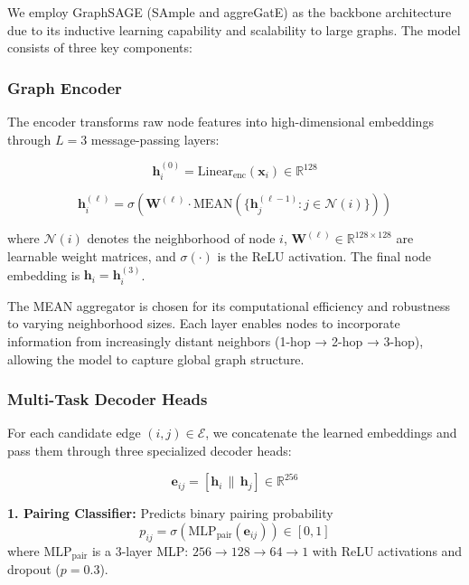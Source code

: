 We employ GraphSAGE (SAmple and aggreGatE) as the backbone architecture due to its inductive learning capability and scalability to large graphs. The model consists of three key components:

\subsubsection{Graph Encoder}

The encoder transforms raw node features into high-dimensional embeddings through $L=3$ message-passing layers:

\begin{equation}
\mathbf{h}_i^{(0)} = \text{Linear}_{\text{enc}}(\mathbf{x}_i) \in \mathbb{R}^{128}
\end{equation}

\begin{equation}
\mathbf{h}_i^{(\ell)} = \sigma\left( \mathbf{W}^{(\ell)} \cdot \text{MEAN}\left(\{\mathbf{h}_j^{(\ell-1)} : j \in \mathcal{N}(i)\}\right) \right)
\end{equation}

where $\mathcal{N}(i)$ denotes the neighborhood of node $i$, $\mathbf{W}^{(\ell)} \in \mathbb{R}^{128 \times 128}$ are learnable weight matrices, and $\sigma(\cdot)$ is the ReLU activation. The final node embedding is $\mathbf{h}_i = \mathbf{h}_i^{(3)}$.

The MEAN aggregator is chosen for its computational efficiency and robustness to varying neighborhood sizes. Each layer enables nodes to incorporate information from increasingly distant neighbors (1-hop → 2-hop → 3-hop), allowing the model to capture global graph structure.

\subsubsection{Multi-Task Decoder Heads}

For each candidate edge $(i, j) \in \mathcal{E}$, we concatenate the learned embeddings and pass them through three specialized decoder heads:

\begin{equation}
\mathbf{e}_{ij} = [\mathbf{h}_i \, \| \, \mathbf{h}_j] \in \mathbb{R}^{256}
\end{equation}

\textbf{1. Pairing Classifier:} Predicts binary pairing probability
\begin{equation}
p_{ij} = \sigma\left( \text{MLP}_{\text{pair}}(\mathbf{e}_{ij}) \right) \in [0, 1]
\end{equation}
where $\text{MLP}_{\text{pair}}$ is a 3-layer MLP: $256 \to 128 \to 64 \to 1$ with ReLU activations and dropout ($p=0.3$).

